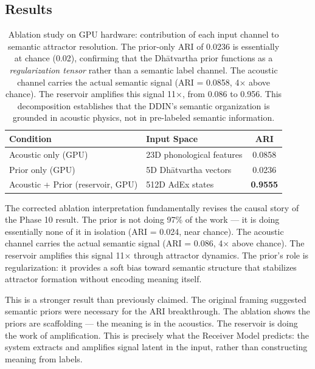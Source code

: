 \documentclass{article}
\begin{document}
\subsection{Results}

\begin{table}[h]
\centering
\begin{tabular}{llc}
\toprule
Condition & Input Space & ARI \\
\midrule
Acoustic only (GPU) & 23D phonological features & 0.0858 \\
Prior only (GPU) & 5D Dhātvartha vectors & 0.0236 \\
Acoustic + Prior (reservoir, GPU) & 512D AdEx states & \textbf{0.9555} \\
\bottomrule
\end{tabular}
\caption{Ablation study on GPU hardware: contribution of each input channel to
semantic attractor resolution. The prior-only ARI of 0.0236 is essentially at chance
(0.02), confirming that the Dhātvartha prior functions as a \textit{regularization
tensor} rather than a semantic label channel. The acoustic channel carries the
actual semantic signal (ARI = 0.0858, 4$\times$ above chance). The reservoir
amplifies this signal 11$\times$, from 0.086 to 0.956. This decomposition establishes
that the DDIN's semantic organization is grounded in acoustic physics, not in
pre-labeled semantic information.}
\label{tab:ablation}
\end{table}

The corrected ablation interpretation fundamentally revises the causal story of the Phase 10 result. The prior is not doing 97\% of the work — it is doing essentially none of it in isolation (ARI = 0.024, near chance). The acoustic channel carries the actual semantic signal (ARI = 0.086, 4$\times$ above chance). The reservoir amplifies this signal 11$\times$ through attractor dynamics. The prior's role is regularization: it provides a soft bias toward semantic structure that stabilizes attractor formation without encoding meaning itself.

This is a stronger result than previously claimed. The original framing suggested semantic priors were necessary for the ARI breakthrough. The ablation shows the priors are scaffolding — the meaning is in the acoustics. The reservoir is doing the work of amplification. This is precisely what the Receiver Model predicts: the system extracts and amplifies signal latent in the input, rather than constructing meaning from labels.
\end{document}
